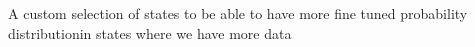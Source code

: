 A custom selection of states to be able to have more fine tuned probability distributionin states where we have more data
